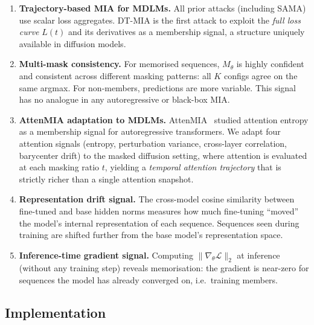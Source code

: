 \documentclass[11pt,a4paper]{article}
\begin{document}
\begin{enumerate}
  \item \textbf{Trajectory-based MIA for MDLMs.}
        All prior attacks (including SAMA) use scalar loss aggregates.
        DT-MIA is the first attack to exploit the \emph{full loss curve} $L(t)$
        and its derivatives as a membership signal, a structure uniquely available
        in diffusion models.

  \item \textbf{Multi-mask consistency.}
        For memorised sequences, $M_\theta$ is highly confident and consistent
        across different masking patterns: all $K$ configs agree on the same
        argmax.  For non-members, predictions are more variable.  This signal has
        no analogue in any autoregressive or black-box MIA.

  \item \textbf{AttenMIA adaptation to MDLMs.}
        AttenMIA~\cite{attenmia} studied attention entropy as a membership signal
        for autoregressive transformers.  We adapt four attention signals
        (entropy, perturbation variance, cross-layer correlation, barycenter drift)
        to the masked diffusion setting, where attention is evaluated at each
        masking ratio $t$, yielding a \emph{temporal attention trajectory} that
        is strictly richer than a single attention snapshot.

  \item \textbf{Representation drift signal.}
        The cross-model cosine similarity between fine-tuned and base hidden norms
        measures how much fine-tuning ``moved'' the model's internal representation
        of each sequence.  Sequences seen during training are shifted further from
        the base model's representation space.

  \item \textbf{Inference-time gradient signal.}
        Computing $\|\nabla_\theta \mathcal{L}\|_2$ at inference (without any
        training step) reveals memorisation: the gradient is near-zero for
        sequences the model has already converged on, i.e.\ training members.
\end{enumerate}

\subsection{Implementation}
\end{document}
